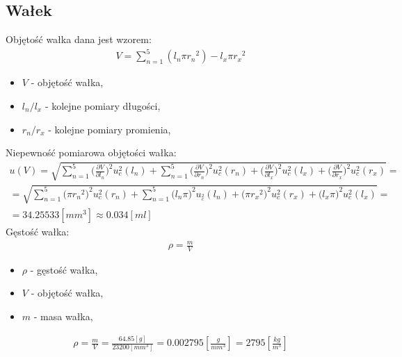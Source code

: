\documentclass[11pt]{article}
\begin{document}
    \subsection{Wałek}
    \noindent Objętość wałka dana jest wzorem:
    \begin{align*}
        V =  \sum_{n=1}^{5}(l_n\pi {r_{n}}^2)-l_x\pi {r_{x}}^2
    \end{align*}
    {
        \footnotesize
        \begin{itemize}
            \setlength\itemsep{0.1em}
            \item[] $V$ - objętość wałka,
            \item[] $l_n/l_x$ - kolejne pomiary długości,
            \item[] $r_n/r_x$ - kolejne pomiary promienia,
        \end{itemize}
    }
    \noindent Niepewność pomiarowa objętości wałka:
    \begin{gather*}
        u(V) = \sqrt{\sum_{n=1}^{5} \biggl(\frac{\partial V}{\partial l_n}\biggr)^2 u_c^2(l_n)+
                {\sum_{n=1}^{5} \biggl(\frac{\partial V}{\partial r_n}\biggr)^2 u_c^2(r_n)}+
                { \biggl(\frac{\partial V}{\partial l_x}\biggr)^2 u_c^2(l_x)}+
                { \biggl(\frac{\partial V}{\partial r_x}\biggr)^2 u_c^2(r_x)}}=\\
        =\sqrt{ \sum_{n=1}^{5} { \biggl( \pi {r_n}^2 \biggr)^2 u_c^2(r_n)}+
                { \sum_{n=1}^{5} { \biggl( l_n \pi \biggr)^2 u__c^2(l_n)}}+
                { \biggl(  \pi {r_x}^2 \biggr)^2 u_c^2(r_x)}+
                { \biggl( l_x \pi  \biggr)^2 u_c^2(l_x)}}=\\
        =34.25533[mm^3]\approx 0.034 [ml]
    \end{gather*}
    \noindent Gęstość wałka:
    \begin{gather*}
        \rho=\frac{m}{V}
    \end{gather*}
    {
        \footnotesize
        \begin{itemize}
            \setlength\itemsep{0.1em}
            \item[] $\rho$ - gęstość wałka,
            \item[] $V$ - objętość wałka,
            \item[] $m$ - masa wałka,
        \end{itemize}
    }
    \begin{gather*}
        \rho=\frac{m}{V}=\frac{64.85[g]}{23200[mm^3]}=0.002795[\frac{g}{mm^3}]=2795[\frac{kg}{m^3}]
    \end{gather*}
\end{document}
